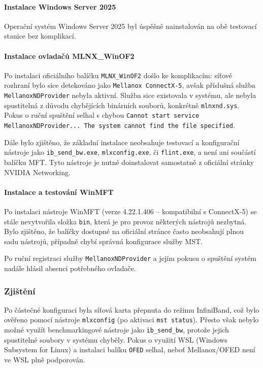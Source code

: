 \paragraph{Instalace Windows Server 2025}  
Operační systém Windows Server 2025 byl úspěšně nainstalován na obě testovací stanice bez komplikací.

\paragraph{Instalace ovladačů MLNX\_WinOF2}  
Po instalaci oficiálního balíčku \texttt{MLNX\_WinOF2} došlo ke komplikacím: síťové rozhraní bylo sice detekováno jako \texttt{Mellanox ConnectX-5}, avšak příslušná služba \texttt{MellanoxNDProvider} nebyla aktivní. Služba sice existovala v systému, ale nebyla spustitelná z důvodu chybějících binárních souborů, konkrétně \texttt{mlnxnd.sys}. Pokus o ruční spuštění selhal s chybou \texttt{Cannot start service MellanoxNDProvider... The system cannot find the file specified}.  

Dále bylo zjištěno, že základní instalace neobsahuje testovací a konfigurační nástroje jako \texttt{ib\_send\_bw.exe}, \texttt{mlxconfig.exe}, či \texttt{flint.exe}, a není ani součástí balíčku MFT. Tyto nástroje je nutné doinstalovat samostatně z oficiální stránky NVIDIA Networking.

\paragraph{Instalace a testování WinMFT}  
Po instalaci nástroje WinMFT (verze 4.22.1.406 – kompatibilní s ConnectX-5) se stále nevytvořila složka \texttt{bin}, která je pro provoz některých nástrojů nezbytná. Bylo zjištěno, že balíčky dostupné na oficiální stránce často neobsahují plnou sadu nástrojů, případně chybí správná konfigurace služby MST.

Po ruční registraci služby \texttt{MellanoxNDProvider} a jejím pokusu o spuštění systém nadále hlásil absenci potřebného ovladače.

\subsubsection{Zjištění}
Po částečné konfiguraci byla síťová karta přepnuta do režimu InfiniBand, což bylo ověřeno pomocí nástroje \texttt{mlxconfig} (po aktivaci \texttt{mst status}). Přesto však nebylo možné využít benchmarkingové nástroje jako \texttt{ib\_send\_bw}, protože jejich spustitelné soubory v systému chyběly. Pokus o využití WSL (Windows Subsystem for Linux) a instalaci balíku \texttt{OFED} selhal, neboť Mellanox/OFED není ve WSL plně podporován.

